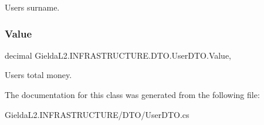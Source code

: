 User\textquotesingle{}s surname. 

\mbox{\label{class_gielda_l2_1_1_i_n_f_r_a_s_t_r_u_c_t_u_r_e_1_1_d_t_o_1_1_user_d_t_o_a39911edf0bf2a44d765aad6c7807b809}} 
\subsubsection{\texorpdfstring{Value}{Value}}
{\footnotesize\ttfamily decimal Gielda\+L2.\+I\+N\+F\+R\+A\+S\+T\+R\+U\+C\+T\+U\+R\+E.\+D\+T\+O.\+User\+D\+T\+O.\+Value\hspace{0.3cm}{\ttfamily [get]}, {\ttfamily [set]}}



User\textquotesingle{}s total money. 



The documentation for this class was generated from the following file\+:\begin{DoxyCompactItemize}
\item 
Gielda\+L2.\+I\+N\+F\+R\+A\+S\+T\+R\+U\+C\+T\+U\+R\+E/\+D\+T\+O/User\+D\+T\+O.\+cs\end{DoxyCompactItemize}
